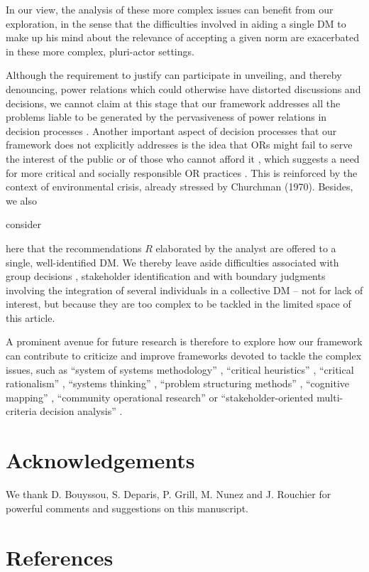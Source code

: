 \documentclass[preprint, french, english, 11pt, authoryear]{elsarticle}%
\newcommand{\ac}[1]{#1}
\newcommand{\acp}[1]{#1s}
\begin{document}
In our view, the analysis of these more complex issues can benefit from our exploration, in the sense that the difficulties involved in aiding a single \ac{DM} to make up his mind about the relevance of accepting a given norm are exacerbated in these more complex, pluri-actor settings.

\begin{changebar}Although the requirement to justify can participate in unveiling, and thereby denouncing, power relations which could otherwise have distorted discussions and decisions, 
we cannot claim at this stage that our framework addresses all the problems liable to be generated by the pervasiveness of power relations in decision processes \citep{cronin_issues_2014}.
Another important aspect of decision processes that our framework does not explicitly addresses is the idea that \acp{OR} might fail to serve the interest of the public or of those who cannot afford it \citep{rosenhead_report_1986}, 
which suggests a need for more critical and socially responsible OR practices \citep{jackson_systems_2000,ulrich_beyond_2003}. This is reinforced by the context of environmental crisis, already stressed by Churchman (1970).
Besides, we also \begin{changebar}consider\end{changebar} here that the recommendations $R$ elaborated by the analyst are offered to a single, well-identified \ac{DM}.
We thereby leave aside difficulties associated with group decisions \citep{jackson_towards_1984}, stakeholder identification \citep{wang_systemic_2015} and with boundary judgments involving the integration of several individuals in a collective \ac{DM} \citep{midgley_systemic_2000}
-- not for lack of interest, but because they are too complex to be tackled in the limited space of this article.\end{changebar}
A prominent avenue for future research is therefore to explore how our framework can contribute to criticize and improve frameworks devoted to tackle the complex issues, such as ``system of systems methodology'' \citep{jackson_towards_1984}, ``critical heuristics'' \citep{ulrich_critical_1987}, 
``critical rationalism'' \citep{ormerod_critical_2014}, ``systems thinking'' \citep{mingers_review_2010}, ``problem structuring methods'' \citep{hector_problem-structuring_2009}, ``cognitive mapping'' \citep{eden_analyzing_2004}, ``community operational research'' \citep{johnson_emerging_2018} or 
``stakeholder-oriented multi-criteria decision analysis'' \citep{de_brucker_multi-criteria_2013}.

\setcounter{secnumdepth}{0}
\section{Acknowledgements}
We thank D. Bouyssou, S. Deparis, P. Grill, M. Nunez and J. Rouchier for powerful comments and suggestions on this manuscript.

\section{References}

\end{document}
